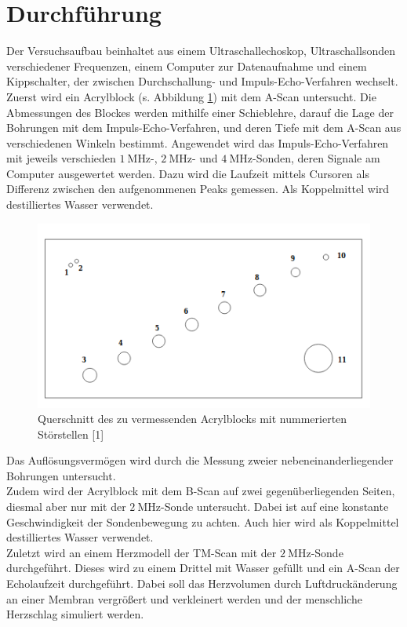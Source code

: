 \section{Durchführung}
\label{sec:Durchführung}

Der Versuchsaufbau beinhaltet aus einem Ultraschallechoskop,
Ultraschallsonden verschiedener Frequenzen, einem Computer
zur Datenaufnahme und einem Kippschalter, der zwischen
Durchschallung- und Impuls-Echo-Verfahren wechselt. \\

Zuerst wird ein Acrylblock (s. Abbildung \ref{fig:block}) mit dem A-Scan untersucht.
Die Abmessungen des Blockes werden mithilfe einer 
Schieblehre, darauf die Lage der Bohrungen mit dem
Impuls-Echo-Verfahren, und deren Tiefe mit dem A-Scan
aus verschiedenen Winkeln bestimmt. Angewendet wird das Impuls-Echo-Verfahren 
mit jeweils verschieden $\SI{1}{\mega\hertz}$-, $\SI{2}{\mega\hertz}$- und 
$\SI{4}{\mega\hertz}$-Sonden, deren Signale am Computer ausgewertet werden.
Dazu wird die Laufzeit mittels Cursoren als Differenz zwischen den aufgenommenen Peaks gemessen.
Als Koppelmittel wird destilliertes Wasser verwendet. \\

\begin{figure} [H]
    \centering
    \includegraphics[scale=0.5]{content/bild1.png}
    \caption{Querschnitt des zu vermessenden Acrylblocks mit nummerierten Störstellen [1]}
    \label{fig:block}
  \end{figure}

Das Auflösungsvermögen wird durch die Messung zweier
nebeneinanderliegender Bohrungen untersucht.\\

Zudem wird der Acrylblock mit dem B-Scan auf zwei gegenüberliegenden Seiten,
diesmal aber nur mit
der $\SI{2}{\mega\hertz}$-Sonde untersucht. Dabei ist
auf eine konstante Geschwindigkeit der Sondenbewegung zu achten.
Auch hier wird als Koppelmittel destilliertes Wasser verwendet.\\

Zuletzt wird an einem Herzmodell der TM-Scan mit der $\SI{2}{\mega\hertz}$-Sonde durchgeführt.
Dieses wird zu einem Drittel mit Wasser gefüllt und ein
A-Scan der Echolaufzeit durchgeführt.
Dabei soll das Herzvolumen durch Luftdruckänderung an einer
Membran vergrößert und verkleinert werden
und der menschliche Herzschlag simuliert werden.

